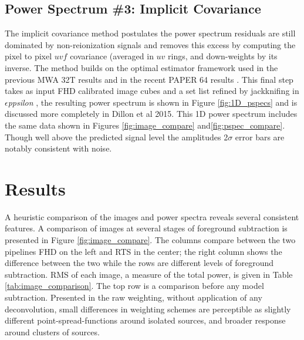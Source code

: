 \documentclass[preprint]{aastex}
\def\eppsilon{{\it $\epsilon$ppsilon }}
\def\dilloncite{Dillon et al 2015}
\begin{document}

\subsection{Power Spectrum \#3: Implicit Covariance}
\label{sec:implicit_cov}
The implicit covariance method \cite{Liu:2011p8763} postulates the power spectrum residuals are still dominated by non-reionization signals and removes this excess by computing the pixel to pixel $uvf$ covariance (averaged in $uv$ rings, and down-weights by its inverse. The method builds on the optimal estimator framework used in the previous MWA 32T results \cite{Dillon:2014p9788} and in the recent PAPER 64 results \cite{2015arXiv150206016A}.  This final step takes as input FHD calibrated image cubes and a set list refined by jackknifing in \eppsilon, the resulting power spectrum is shown in Figure \ref{fig:1D_pspecs} and is discussed more completely in \dilloncite.  This 1D power spectrum includes the same data shown in Figures \ref{fig:image_compare} and\ref{fig:pspec_compare}. Though well above the predicted signal level the amplitudes 2$\sigma$ error bars are notably consistent with noise.


\section{Results}
\label{sec:results}
A heuristic comparison of the images and power spectra reveals several consistent features. A comparison of images at several stages of foreground subtraction is presented in Figure \ref{fig:image_compare}. The columns compare between the two pipelines FHD on the left and RTS in the center; the right column shows the difference between the two while the rows are different levels of foreground subtraction. RMS of  each image, a measure of the total power, is given in Table \ref{tab:image_comparison}.  The top row is a comparison before any model subtraction. Presented in the raw weighting, without application of any deconvolution, small differences in weighting schemes are perceptible as slightly different point-spread-functions around isolated sources, and broader response around clusters of sources.  
\end{document}
